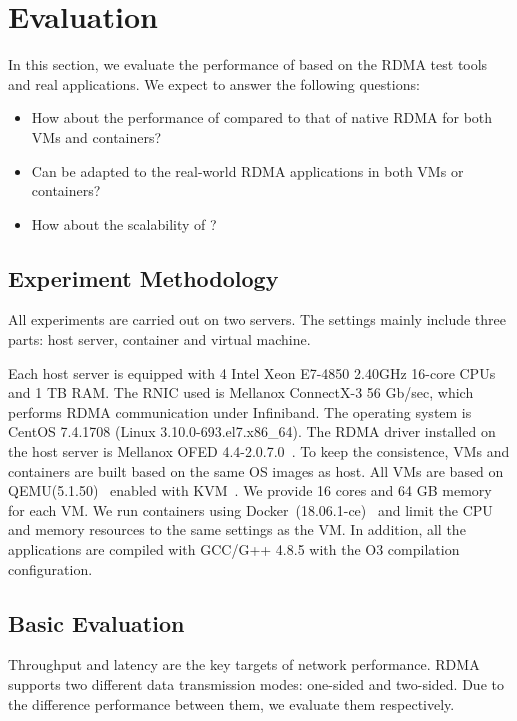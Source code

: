\section{Evaluation} \label{eval}
In this section, we evaluate the performance of \sys based on the RDMA test tools and real applications. We expect to answer the following questions:

\begin{itemize}
\item How about the performance of \sys compared to that of native RDMA for both VMs and containers?
\item Can \sys be adapted to the real-world RDMA applications in both VMs or containers?
\item How about the scalability of \sys?
\end{itemize}

\subsection{Experiment Methodology}


All experiments are carried out on two servers. The settings mainly include three parts: host server, container and virtual machine. 

Each host server is equipped with 4 Intel Xeon E7-4850 2.40GHz 16-core CPUs and 1 TB RAM. The RNIC used is Mellanox ConnectX-3 56 Gb/sec, which performs RDMA communication under Infiniband.  The operating system is CentOS 7.4.1708 (Linux 3.10.0-693.el7.x86\_64). The RDMA driver installed on the host server is Mellanox OFED 4.4-2.0.7.0~\cite{mlnx-ofed}. To keep the consistence, VMs and containers are built based on the same OS images as host. All VMs are based on QEMU(5.1.50)~\cite{qemu} enabled with KVM~\cite{kvm}. We provide 16 cores and 64 GB memory for each VM. We run containers using Docker~(18.06.1-ce)~\cite{docker} and limit the CPU and memory resources to the same settings as the VM. In addition, all the applications are compiled with GCC/G++ 4.8.5 with the O3 compilation configuration. 


\subsection{Basic Evaluation}

Throughput and latency are the key targets of network performance. RDMA supports two different data transmission modes: one-sided and two-sided. Due to the difference performance between them, we evaluate them respectively.

